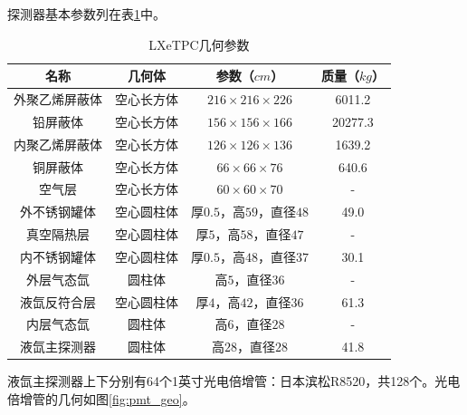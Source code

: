 探测器基本参数列在表\ref{tab:relics_material}中。

\begin{table}
  \centering
  \caption{LXeTPC几何参数}
  \begin{tabular}{cccc}
    \toprule
    名称 & 几何体 & 参数（$\si{cm}$） & 质量（$\si{kg}$） \\
    \midrule
    外聚乙烯屏蔽体 & 空心长方体 & $216\times216\times226$ & 6011.2 \\
    铅屏蔽体 & 空心长方体 & $156\times156\times166$ & 20277.3 \\
    内聚乙烯屏蔽体 & 空心长方体 & $126\times126\times136$ & 1639.2 \\
    铜屏蔽体 & 空心长方体 & $66\times66\times76$ & 640.6 \\
    空气层 & 空心长方体 & $60\times60\times70$ & - \\
    外不锈钢罐体 & 空心圆柱体 & 厚$0.5$，高$59$，直径$48$ & 49.0 \\
    真空隔热层 & 空心圆柱体 & 厚$5$，高$58$，直径$47$ & - \\
    内不锈钢罐体 & 空心圆柱体 & 厚$0.5$，高$48$，直径$37$ & 30.1 \\
    外层气态氙 & 圆柱体 & 高$5$，直径$36$ & - \\
    液氙反符合层 & 空心圆柱体 & 厚$4$，高$42$，直径$36$ & 61.3 \\
    内层气态氙 & 圆柱体 & 高$6$，直径$28$ & - \\
    液氙主探测器 & 圆柱体 & 高$28$，直径$28$ & 41.8 \\
    \bottomrule
  \end{tabular}
  \label{tab:relics_material}
\end{table}

液氙主探测器上下分别有64个1英寸光电倍增管：日本滨松R8520，共128个。光电倍增管的几何如图\ref{fig:pmt_geo}。

